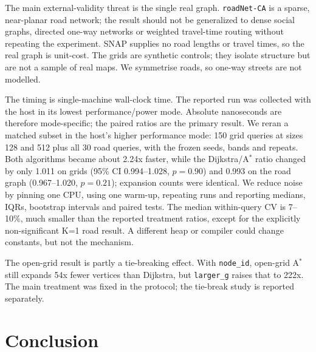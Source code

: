 \documentclass[conference,10pt]{IEEEtran}
\newcommand{\Astar}{A$^\ast$}
\newcommand{\code}[1]{\texttt{#1}}
\begin{document}
The main external-validity threat is the single real graph.  \code{roadNet-CA}
is a sparse, near-planar road network; the result should not be generalized to
dense social graphs, directed one-way networks or weighted travel-time routing
without repeating the experiment.  SNAP supplies no road lengths or travel
times, so the real graph is unit-cost.  The grids are synthetic controls; they
isolate structure but are not a sample of real maps.  We symmetrise roads, so
one-way streets are not modelled.

The timing is single-machine wall-clock time.  The reported run was collected
with the host in its lowest performance/power mode.  Absolute nanoseconds are
therefore mode-specific; the paired ratios are the primary result.  We reran a
matched subset in the host's higher performance mode: 150 grid queries at sizes
128 and 512 plus all 30 road queries, with the frozen seeds, bands and repeats.
Both algorithms became about 2.24x faster, while the Dijkstra/\Astar{} ratio
changed by only 1.011 on grids (95\% CI 0.994--1.028, $p=0.90$) and 0.993 on the
road graph (0.967--1.020, $p=0.21$); expansion counts were identical.  We reduce
noise by pinning one CPU, using one warm-up, repeating runs and reporting
medians, IQRs, bootstrap intervals and paired tests.  The median within-query CV
is 7--10\%, much smaller than the reported treatment ratios, except for the
explicitly non-significant K=1 road result.  A different heap or compiler
could change constants, but not the mechanism.

The open-grid result is partly a tie-breaking effect.  With \code{node\_id},
open-grid \Astar{} still expands 54x fewer vertices than Dijkstra, but
\code{larger\_g} raises that to 222x.  The main treatment was fixed in the
protocol; the tie-break study is reported separately.

\section{Conclusion}
\label{sec:conclusion}
\end{document}
